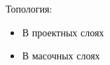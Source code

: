 \documentclass{article}
\begin{document}
Топология:
\begin{itemize}
	\item В проектных слоях
	\item В масочных слоях
\end{itemize}
\end{document}
